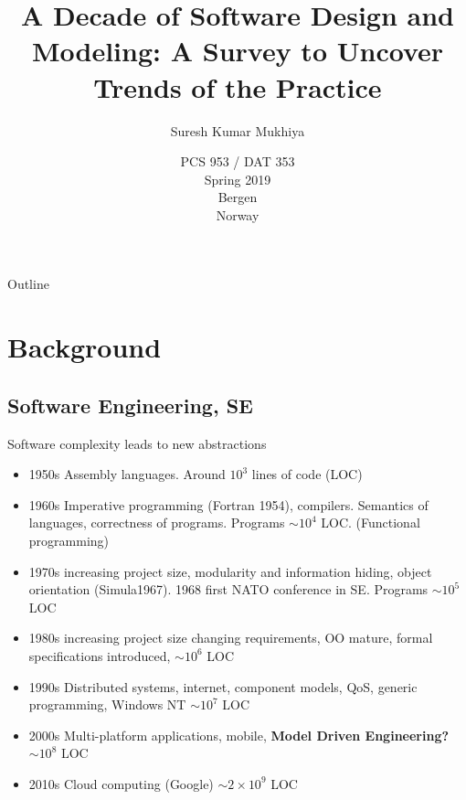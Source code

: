 \documentclass[slidetop,mathserif,red]{beamer}
\title{A Decade of Software Design and Modeling: A Survey to Uncover Trends of the Practice}
\author[Suresh Kumar Mukhiya]{{Suresh Kumar Mukhiya}}
\institute[Bergen University College]{ Western Norway University of Applied Sciences}
\date[Autumn 2017]{PCS 953 / {DAT 353} \\ Spring 2019\\ Bergen \\ Norway}
\begin{document}
\begin{frame}
  \titlepage
\end{frame}

\begin{frame}{Outline}
\end{frame}

\section{Background}
\subsection{Software Engineering, SE}
\begin{frame}{Software complexity %
leads to new abstractions}%
    \begin{itemize}

      \item 1950s Assembly languages. %
      Around $10^3$ lines of code (LOC)

      \item 1960s Imperative programming (Fortran 1954), compilers. Semantics of languages, correctness of programs. Programs $\sim 10^4$ LOC. (Functional programming)

      \item 1970s increasing project size, modularity and information hiding, object orientation (Simula1967). 1968 first NATO conference in SE. Programs $\sim 10^5$ LOC

      \item 1980s increasing project size changing requirements, OO mature, formal specifications introduced, $\sim 10^6$ LOC

      \item 1990s Distributed systems, internet, component models, QoS, generic programming, Windows NT $\sim 10^7$ LOC

      \item 2000s Multi-platform applications, mobile,  {\bf Model Driven Engineering?} $\sim 10^8$ LOC
      
      \item 2010s Cloud computing (Google) $\sim 2 \times 10^9$ LOC
    \end{itemize}

\end{frame}
\end{document}
